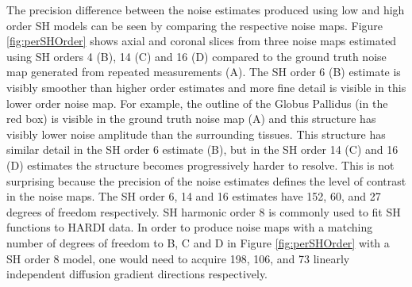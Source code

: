 The precision difference between the noise estimates produced using low
and high order SH models can be seen by comparing the respective noise
maps. Figure \ref{fig:perSHOrder} shows axial and coronal slices from three noise maps
estimated using SH orders 4 (B), 14 (C) and 16 (D) compared to the
ground truth noise map generated from repeated measurements (A). The SH
order 6 (B) estimate is visibly smoother than higher order estimates and
more fine detail is visible in this lower order noise map. For example,
the outline of the Globus Pallidus (in the red box) is visible in the
ground truth noise map (A) and this structure has visibly lower noise
amplitude than the surrounding tissues. This structure has similar
detail in the SH order 6 estimate (B), but in the SH order 14 (C) and 16
(D) estimates the structure becomes progressively harder to resolve.
This is not surprising because the precision of the noise estimates
defines the level of contrast in the noise maps. The SH order 6, 14 and
16 estimates have 152, 60, and 27 degrees of freedom respectively. SH
harmonic order 8 is commonly used to fit SH functions to HARDI data. In
order to produce noise maps with a matching number of degrees of freedom
to B, C and D in Figure \ref{fig:perSHOrder} with a SH order 8 model, one would need to
acquire 198, 106, and 73 linearly independent diffusion gradient
directions respectively.